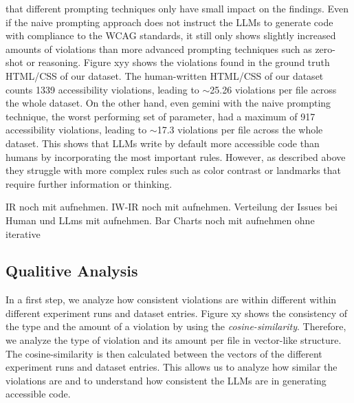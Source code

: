 that different prompting techniques only have small impact on the findings.
Even if the naive prompting approach does not instruct the LLMs to generate
code with compliance to the WCAG standards, it still only shows slightly 
increased amounts of violations than more advanced prompting techniques such as 
zero-shot or reasoning.\newline
Figure xyy shows the violations found in the ground truth HTML/CSS of our 
dataset. The human-written HTML/CSS of our dataset counts 1339 accessibility 
violations, leading to $\sim$25.26 violations per file across the whole dataset.
On the other hand, even gemini with the naive prompting technique,
the worst performing set of parameter, had a maximum of 917 accessibility 
violations, leading to $\sim$17.3 violations per file across the whole dataset.
This shows that LLMs write by default more accessible code than humans by 
incorporating the most important rules. However, as described above they 
struggle with more complex rules such as color contrast or landmarks
that require further information or thinking.

IR noch mit aufnehmen.
IW-IR noch mit aufnehmen.
Verteilung der Issues bei Human und LLms mit aufnehmen.
Bar Charts noch mit aufnehmen ohne iterative


\subsection{Qualitive Analysis}
In a first step, we analyze how consistent violations are within different 
within different experiment runs and dataset entries. Figure xy shows the 
consistency of the type and the amount of a violation by using the 
\textit{cosine-similarity}. Therefore, we analyze the type of violation
and its amount per file in vector-like structure. 
The cosine-similarity is then calculated between the vectors of the 
different experiment runs and dataset entries. This allows us to 
analyze how similar the violations are and to understand how consistent
the LLMs are in generating accessible code.

\newcommand{\vect}[1]{\begin{pmatrix}#1\end{pmatrix}}
\newcommand{\issues}{k}                   %
\newcommand{\vx}{\mathbf x}
\newcommand{\vy}{\mathbf y}

